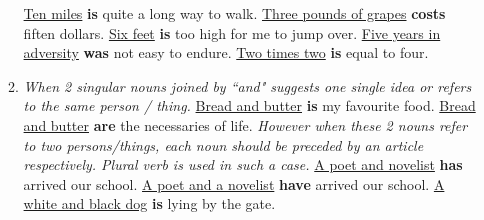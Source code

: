 \begin{enumerate}
\begin{enumerate}
{                }
                \newline
                \newline
                \underline{Ten miles} \textbf{is} quite a long way to walk.
                \newline
                \newline
                \underline{Three pounds of grapes} \textbf{costs} fiften dollars.
                \newline
                \newline
                \underline{Six feet} \textbf{is} too high for me to jump over.
                \newline
                \newline
                \underline{Five years in adversity} \textbf{was} not easy to endure.
                \newline
                \newline
                \underline{Two times two} \textbf{is} equal to four.
            \item
                {\it
                When 2 singular nouns joined by ``and" suggests one single idea
                or refers to the same person / thing.
                }
                \newline
                \newline
                \underline{Bread and butter} \textbf{is} my favourite food.
                \newline
                \underline{Bread and butter} \textbf{are} the necessaries of
                life.
                \newline
                \newline
                {\it
                However when these 2 nouns refer to two persons/things, each
                noun should be preceded by an article respectively. Plural verb
                is used in such a case.
                }
                \newline
                \newline
                \underline{A poet and novelist} \textbf{has} arrived our school.
                \newline
                \underline{A poet and a novelist} \textbf{have} arrived our
                school.
                \newline
                \newline
                \underline{A white and black dog} \textbf{is} lying by the gate.

\end{enumerate}
\end{enumerate}
